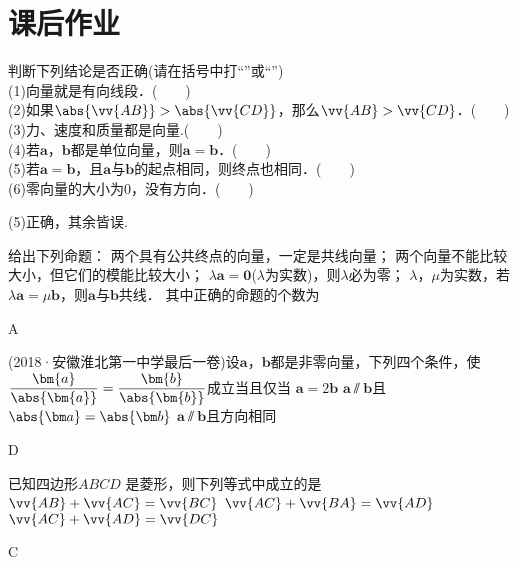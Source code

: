 \section{课后作业}
  \begin{exercise}
    \item%
      判断下列结论是否正确(请在括号中打“\checkmark”或“\XSolidBrush”)\\
      (1)向量就是有向线段．(　　)\\
      (2)如果$\abs{\vv{AB}}>\abs{\vv{CD}}$，那么$\vv{AB}>\vv{CD}$．(　　)\\
      (3)力、速度和质量都是向量.(　　)\\
      (4)若$\bm a$，$\bm b$都是单位向量，则$\bm a=\bm b$．(　　)\\
      (5)若$\bm a=\bm b$，且$\bm a$与$\bm b$的起点相同，则终点也相同．(　　)\\
      (6)零向量的大小为0，没有方向．(　　)
      \begin{answer}
        (5)正确，其余皆误.
      \end{answer}
    \item
      给出下列命题：
      两个具有公共终点的向量，一定是共线向量；
      两个向量不能比较大小，但它们的模能比较大小；
      $\lambda\bm{a}=\bm{0}$($\lambda$为实数)，则$\lambda$必为零；
      $\lambda$，$\mu$为实数，若$\lambda\bm{a}=\mu\bm{b}$，则$\bm{a}$与$\bm{b}$共线．
      其中正确的命题的个数为\xz
      \begin{answer}
        A
      \end{answer}
    \item
      (2018·安徽淮北第一中学最后一卷)设$\bm{a}$，$\bm{b}$都是非零向量，下列四个条件，使$\dfrac{\bm{a}}{\abs{\bm{a}}}=\dfrac{\bm{b}}{\abs{\bm{b}}}$成立当且仅当\xz
      {$\bm a=2\bm b$}
      {$\bm a\varparallel\bm b$且$\abs{\bm a}=\abs{\bm b}$}
      {$\bm a\varparallel\bm b$且方向相同}
      \begin{answer}
        D
      \end{answer}
    \item
      已知四边形$ABCD$ 是菱形，则下列等式中成立的是\xz
        {$\vv{AB}+\vv{AC}=\vv{BC}$}
        {$\vv{AC}+\vv{BA}=\vv{AD}$}
        {$\vv{AC}+\vv{AD}=\vv{DC}$}
      \begin{answer}
        C
      \end{answer}
    \item%

\end{exercise}

